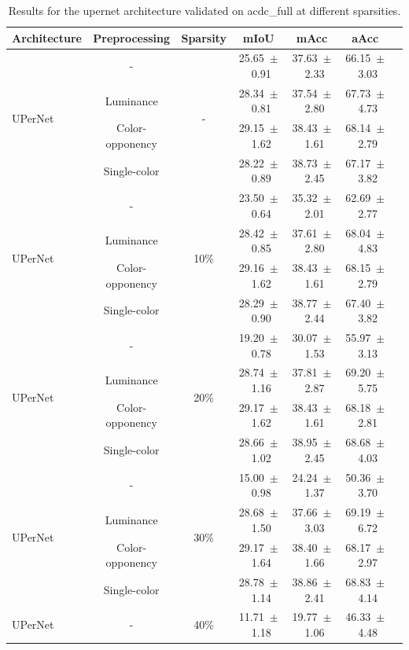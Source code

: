\begin{table}[h]
\centering
\caption{Results for the upernet architecture validated on acdc_full at different sparsities.}
\begin{tabular}{@{}lccc ccc@{}}
\toprule
Architecture & Preprocessing & Sparsity & mIoU & mAcc & aAcc \\
\midrule

\multirow{4}{*}{UPerNet} & - & \multirow{4}{*}{-} & 25.65~$\pm$~0.91 & 37.63~$\pm$~2.33 & 66.15~$\pm$~3.03 \\
& Luminance & & 28.34~$\pm$~0.81 & 37.54~$\pm$~2.80 & 67.73~$\pm$~4.73 \\
& Color-opponency & & 29.15~$\pm$~1.62 & 38.43~$\pm$~1.61 & 68.14~$\pm$~2.79 \\
& Single-color & & 28.22~$\pm$~0.89 & 38.73~$\pm$~2.45 & 67.17~$\pm$~3.82 \\
\midrule
\multirow{4}{*}{UPerNet} & - & \multirow{4}{*}{10\%} & 23.50~$\pm$~0.64 & 35.32~$\pm$~2.01 & 62.69~$\pm$~2.77 \\
& Luminance & & 28.42~$\pm$~0.85 & 37.61~$\pm$~2.80 & 68.04~$\pm$~4.83 \\
& Color-opponency & & 29.16~$\pm$~1.62 & 38.43~$\pm$~1.61 & 68.15~$\pm$~2.79 \\
& Single-color & & 28.29~$\pm$~0.90 & 38.77~$\pm$~2.44 & 67.40~$\pm$~3.82 \\
\midrule
\multirow{4}{*}{UPerNet} & - & \multirow{4}{*}{20\%} & 19.20~$\pm$~0.78 & 30.07~$\pm$~1.53 & 55.97~$\pm$~3.13 \\
& Luminance & & 28.74~$\pm$~1.16 & 37.81~$\pm$~2.87 & 69.20~$\pm$~5.75 \\
& Color-opponency & & 29.17~$\pm$~1.62 & 38.43~$\pm$~1.61 & 68.18~$\pm$~2.81 \\
& Single-color & & 28.66~$\pm$~1.02 & 38.95~$\pm$~2.45 & 68.68~$\pm$~4.03 \\
\midrule
\multirow{4}{*}{UPerNet} & - & \multirow{4}{*}{30\%} & 15.00~$\pm$~0.98 & 24.24~$\pm$~1.37 & 50.36~$\pm$~3.70 \\
& Luminance & & 28.68~$\pm$~1.50 & 37.66~$\pm$~3.03 & 69.19~$\pm$~6.72 \\
& Color-opponency & & 29.17~$\pm$~1.64 & 38.40~$\pm$~1.66 & 68.17~$\pm$~2.97 \\
& Single-color & & 28.78~$\pm$~1.14 & 38.86~$\pm$~2.41 & 68.83~$\pm$~4.14 \\
\midrule
\multirow{4}{*}{UPerNet} & - & \multirow{4}{*}{40\%} & 11.71~$\pm$~1.18 & 19.77~$\pm$~1.06 & 46.33~$\pm$~4.48 \\

\end{tabular}
\end{table}
